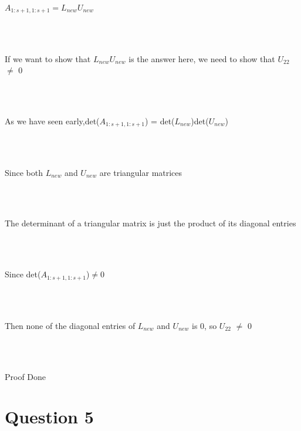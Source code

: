 \documentclass[11pt]{article} %
\begin{document}
\centerline{$A_{1:s+1,1:s+1} = L_{new}U_{new}$}\\\\
\centerline{If we want to show that $L_{new}U_{new}$ is the answer here, we need to show that $U_{22}$ $\ne$ 0}\\\\
\centerline{As we have seen early,det($A_{1:s+1,1:s+1}$) = det($L_{new}$)det($U_{new}$)}\\\\
\centerline{Since both $L_{new}$ and $U_{new}$ are triangular matrices}\\\\
\centerline{The determinant of a triangular matrix is just the product of its diagonal entries}\\\\
\centerline{Since det($A_{1:s+1,1:s+1}$)$\neq$0}\\\\
\centerline{Then none of the diagonal entries of $L_{new}$ and $U_{new}$ is 0, so $U_{22}$ $\ne$ 0}\\\\
\centerline{Proof Done}
\section{Question 5}
\end{document}

